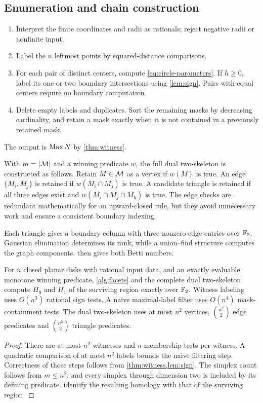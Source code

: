 \subsection{Enumeration and chain construction}
\begin{algorithm}\label{alg:facets}
\leavevmode
\begin{enumerate}
\item Interpret the finite coordinates and radii as rationals; reject negative radii or nonfinite input.
\item Label the $n$ leftmost points by squared-distance comparisons.
\item For each pair of distinct centers, compute \cref{eq:circle-parameters}. If $h\ge0$, label its one or two boundary intersections using \cref{lem:sign}. Pairs with equal centers require no boundary computation.
\item Delete empty labels and duplicates. Sort the remaining masks by decreasing cardinality, and retain a mask exactly when it is not contained in a previously retained mask.
\end{enumerate}
The output is $\operatorname{Max} N$ by \cref{thm:witness}.
\end{algorithm}

With $m=\left|\mathcal M\right|$ and a winning predicate $w$, the full dual two-skeleton is constructed as follows. Retain $M\in\mathcal M$ as a vertex if $w(M)$ is true. An edge $\{M_i,M_j\}$ is retained if $w(M_i\cap M_j)$ is true. A candidate triangle is retained if all three edges exist and $w(M_i\cap M_j\cap M_k)$ is true. The edge checks are redundant mathematically for an upward-closed rule, but they avoid unnecessary work and ensure a consistent boundary indexing.

Each triangle gives a boundary column with three nonzero edge entries over $\mathbb F_2$. Gaussian elimination determines its rank, while a union--find structure computes the graph components.  then gives both Betti numbers.

\begin{theorem}\label{thm:algorithm}
For $n$ closed planar disks with rational input data, and an exactly evaluable monotone winning predicate, \cref{alg:facets} and the complete dual two-skeleton compute $H_0$ and $H_1$ of the surviving region exactly over $\mathbb F_2$. Witness labeling uses $O(n^3)$ rational sign tests. A naive maximal-label filter uses $O(n^4)$ mask-containment tests. The dual two-skeleton uses at most $n^2$ vertices, $\binom{n^2}{2}$ edge predicates and $\binom{n^2}{3}$ triangle predicates.
\end{theorem}
\begin{proof}
There are at most $n^2$ witnesses and $n$ membership tests per witness. A quadratic comparison of at most $n^2$ labels bounds the naive filtering step. Correctness of those steps follows from \cref{thm:witness,lem:sign}. The simplex count follows from $m\le n^2$, and every simplex through dimension two is included by its defining predicate.  identify the resulting homology with that of the surviving region.
\end{proof}

